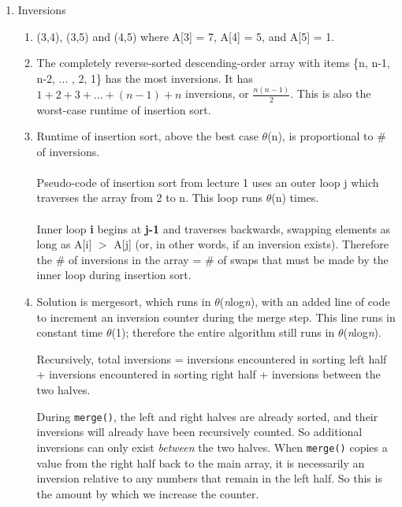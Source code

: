 \documentclass{article}
\begin{document}
\begin{enumerate}
    \item Inversions
    \begin{enumerate}
        \item (3,4), (3,5) and (4,5) where A[3] = 7, A[4] = 5, and A[5] = 1.
        
        \item The completely reverse-sorted descending-order array with items \{n, n-1, n-2, ... , 2, 1\} has the most inversions. It has $1 + 2 + 3 +...+ (n-1) + n$ inversions, or \(\frac{n(n-1)}{2}\). This is also the worst-case runtime of insertion sort.
        
        \item Runtime of insertion sort, above the best case $\theta$(n), is proportional to \# of inversions. \\ \\
        Pseudo-code of insertion sort from lecture 1 uses an outer loop j which traverses the array from 2 to n. This loop runs $\theta$(n) times. \\ \\
        Inner loop \textbf{i} begins at \textbf{j-1} and traverses backwards, swapping elements as long as A[i] $>$ A[j] (or, in other words, if an inversion exists). Therefore the \# of inversions in the array = \# of swaps that must be made by the inner loop during insertion sort. 
        
        \item Solution is mergesort, which runs in $\theta$(\textit{n}log\textit{n}), with an added line of code to increment an inversion counter during the merge step. This line runs in constant time $\theta$(1); therefore the entire algorithm still runs in $\theta$(\textit{n}log\textit{n}). \newline
        
        Recursively, total inversions = inversions encountered in sorting left half + inversions encountered in sorting right half + inversions between the two halves. \newline
        
        During \texttt{merge()}, the left and right halves are already sorted, and their inversions will already have been recursively counted. So additional inversions can only exist \textit{between} the two halves. When \texttt{merge()} copies a value from the right half back to the main array, it is necessarily an inversion relative to any numbers that remain in the left half. So this is the amount by which we increase the counter. \newline
        

\end{enumerate}
\end{enumerate}
\end{document}
